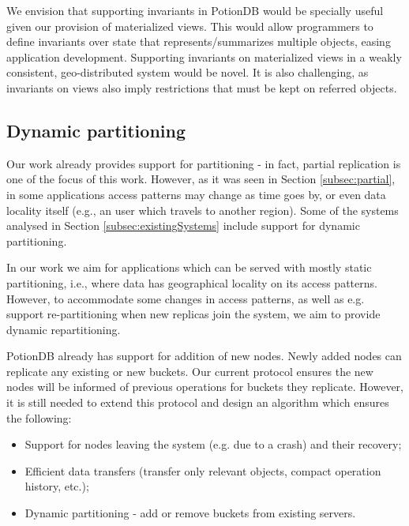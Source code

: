 We envision that supporting invariants in PotionDB would be specially useful given our provision of materialized views.
This would allow programmers to define invariants over state that represents/summarizes multiple objects, easing application development.
Supporting invariants on materialized views in a weakly consistent, geo-distributed system would be novel.
It is also challenging, as invariants on views also imply restrictions that must be kept on referred objects.


\subsection{Dynamic partitioning}

Our work already provides support for partitioning - in fact, partial replication is one of the focus of this work.
However, as it was seen in Section \ref{subsec:partial}, in some applications access patterns may change as time goes by, or even data locality itself (e.g., an user which travels to another region).
Some of the systems analysed in Section \ref{subsec:existingSystems} include support for dynamic partitioning.

In our work we aim for applications which can be served with mostly static partitioning, i.e., where data has geographical locality on its access patterns.
However, to accommodate some changes in access patterns, as well as e.g. support re-partitioning when new replicas join the system, we aim to provide dynamic repartitioning.

PotionDB already has support for addition of new nodes.
Newly added nodes can replicate any existing or new buckets.
Our current protocol ensures the new nodes will be informed of previous operations for buckets they replicate.
However, it is still needed to extend this protocol and design an algorithm which ensures the following:

\begin{itemize}
	\item Support for nodes leaving the system (e.g. due to a crash) and their recovery;
	\item Efficient data transfers (transfer only relevant objects, compact operation history, etc.);
	\item Dynamic partitioning - add or remove buckets from existing servers.
\end{itemize}

